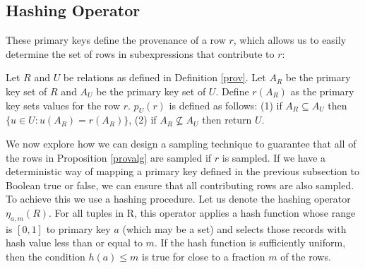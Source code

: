 \subsection{Hashing Operator}
\label{push}
These primary keys define the provenance of a row $r$, which allows us to easily determine the set of rows in subexpressions that contribute
to $r$:
\begin{proposition}\label{provalg}
Let $R$ and $U$ be relations as defined in Definition \ref{prov}. 
Let $A_R$ be the primary key set of $R$ and $A_U$ be the primary key 
set of $U$.
Define $r(A_R)$ as the primary key sets values for the row $r$.
$p_U(r)$ is defined as follows: (1) if $A_R \subseteq A_U$ then 
$\{u \in U: u(A_R) = r(A_R)\}$, (2) if $A_R \not \subseteq A_U$ then
return $U$.
\end{proposition}
We now explore how we can design a sampling technique to guarantee that all of the rows in Proposition \ref{provalg} are sampled if $r$ is sampled.
If we have a deterministic way of mapping a primary key defined in the previous subsection to Boolean true or false, we can ensure that all contributing rows are also sampled. 
To achieve this we use a hashing procedure.
Let us denote the hashing operator $\eta_{a, m}(R)$. 
For all tuples in R, this operator applies a hash function whose range is $[0,1]$ to primary key $a$ (which may be a set) and selects those records with hash value less than or equal to $m$.
If the hash function is sufficiently uniform, then the condition $h(a) \le m$ is true for close to a fraction $m$ of the rows. 

